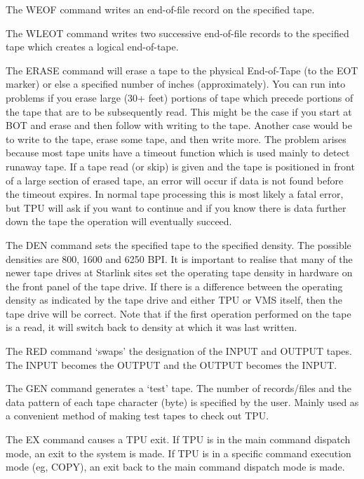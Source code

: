 The WEOF command writes an end-of-file record on the specified tape.

The WLEOT command writes two successive end-of-file records to the specified
tape which creates a logical end-of-tape.

The ERASE command will erase a tape to the physical End-of-Tape (to the EOT
marker) or else a specified number of inches (approximately).
You can run into problems if you erase large (30+ feet) portions of tape which
precede portions of the tape that are to be subsequently read.
This might be the case if you start at BOT and erase and then follow with
writing to the tape.
Another case would be to write to the tape, erase some tape, and then write
more.
The problem arises because most tape units have a timeout function which is used
mainly to detect runaway tape.
If a tape read (or skip) is given and the tape is positioned in front of a large
section of erased tape, an error will occur if data is not found before the
timeout expires.
In normal tape processing this is most likely a fatal error, but TPU will ask if
you want to continue and if you know there is data further down the tape the
operation will eventually succeed.

The DEN command sets the specified tape to the specified density.
The possible densities are 800, 1600 and 6250 BPI.
It is important to realise that many of the newer tape drives at
Starlink sites set the operating tape density in hardware on the
front panel of the tape drive. If there is a difference between the
operating density as indicated by the tape drive and either
TPU or VMS itself, then the tape drive will be correct.
Note that if the first operation performed on the tape is a read, it will
switch back to density at which it was last written.

The RED command `swaps' the designation of the INPUT and OUTPUT tapes.
The INPUT becomes the OUTPUT and the OUTPUT becomes the INPUT.

The GEN command generates a `test' tape.
The number of records/files and the data pattern of each tape character (byte)
is specified by the user.
Mainly used as a convenient method of making test tapes to check out TPU.

The EX command causes a TPU exit.
If TPU is in the main command dispatch mode, an exit to the system is made.
If TPU is in a specific command execution mode (eg, COPY), an exit back to the
main command dispatch mode is made.

\pagebreak	%

